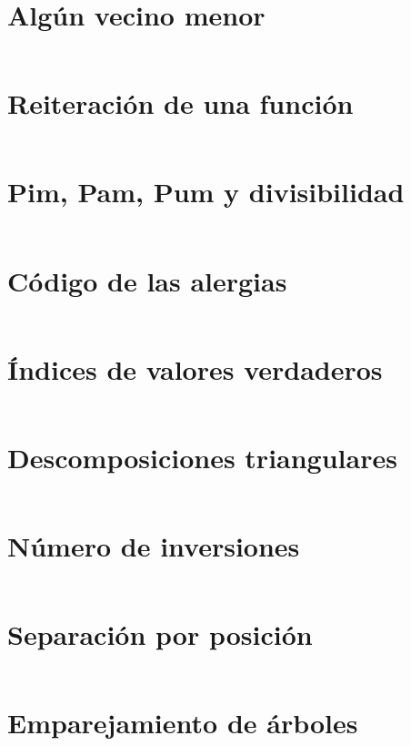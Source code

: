 \documentclass[a4paper,12pt,twoside]{book}
\newcommand{\ejercicio}[1]{\inputminted[firstline=7]{haskell}{../src/#1.hs}}
\begin{document}
\chapter{Algún vecino menor}
\ejercicio{Algun_vecino_menor}

\chapter{Reiteración de una función}
\ejercicio{Reiteracion_de_funciones}


\chapter{Pim, Pam, Pum y divisibilidad}
\ejercicio{PimPamPum}

\chapter{Código de las alergias}
\ejercicio{Alergias}

\chapter{Índices de valores verdaderos}
\ejercicio{Indices_verdaderos}

\chapter{Descomposiciones triangulares}
\ejercicio{Descomposiciones_triangulares}

\chapter{Número de inversiones}
\ejercicio{Numero_de_inversiones}

\chapter{Separación por posición}
\ejercicio{Separacion_por_posicion}

\chapter{Emparejamiento de árboles}
\ejercicio{Emparejamiento_de_arboles}
\end{document}
